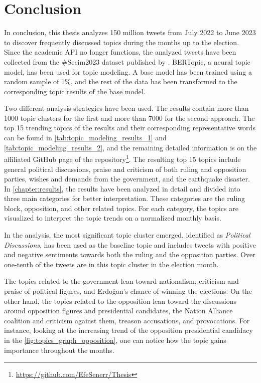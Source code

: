 
\chapter{Conclusion}\label{chapter:conclusion}

In conclusion, this thesis analyzes 150 million tweets from July 2022 to June 2023 to discover 
frequently discussed topics during the months up to the election. Since the academic API no longer 
functions, the analyzed tweets have been collected from the \#Secim2023 dataset published by 
\textcite{secim2023}. BERTopic, a neural topic model, has been used for topic modeling. A base 
model has been trained using a random sample of 1\%, and the rest of the data has been transformed 
to the corresponding topic results of the base model.

Two different analysis strategies have been used. The results contain more than 1000 topic clusters for 
the first and more than 7000 for the second approach. The top 15 trending topics of the results and 
their corresponding representative words can be found in 
\autoref{tab:topic_modeling_results_1} and \autoref{tab:topic_modeling_results_2}, and the remaining 
detailed information is on the affiliated GitHub page of the 
repository\footnote{\url{https://github.com/EfeSenerr/Thesis}}. The resulting top 15 topics include general 
political discussions, praise and criticism of both ruling and opposition parties, wishes and demands from 
the government, and the earthquake disaster. In \autoref{chapter:results}, the results have been 
analyzed in detail and divided into three main categories for better interpretation. These categories 
are the ruling block, opposition, and other related topics. For each category, the topics are 
visualized to interpret the topic trends on a normalized monthly basis. 

In the analysis, the most significant topic cluster emerged, identified as 
\textit{Political Discussions}, has been used as the baseline topic and includes tweets with positive 
and negative sentiments towards both the ruling and the opposition parties. Over one-tenth of the 
tweets are in this topic cluster in the election month. 

The topics related to the government lean toward nationalism, criticism and praise of political 
figures, and Erdoğan's chance of winning the elections.
On the other hand, the topics related to the opposition lean toward the discussions around opposition 
figures and 
presidential candidates, the Nation Alliance coalition and criticism against them, treason accusations,
and provocations. For instance, looking at the increasing trend of the opposition presidential 
candidacy in the \autoref{fig:topics_graph_opposition}, one can notice how the topic gains importance 
throughout the months. 

